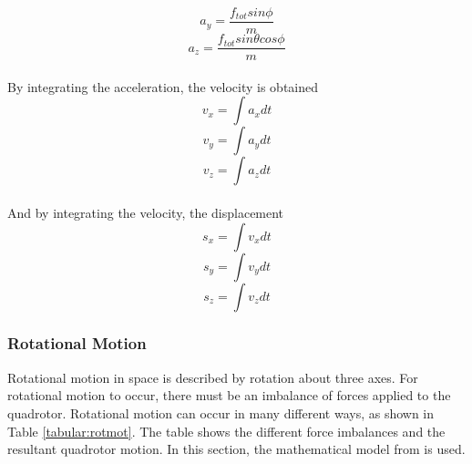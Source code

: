 \begin{equation}
a_y = \frac{f_{tot}sin\phi}{m}
\end{equation}
\begin{equation}
a_z = \frac{f_{tot}sin\theta cos\phi}{m}
\end{equation}
\\
By integrating the acceleration, the velocity is obtained
\begin{equation}
v_x = \int a_xdt
\end{equation}
\begin{equation}
v_y = \int a_ydt
\end{equation}
\begin{equation}
v_z = \int a_zdt
\end{equation}
\\
And by integrating the velocity, the displacement
\begin{equation}
s_x = \int v_xdt
\end{equation}
\begin{equation}
s_y = \int v_ydt
\end{equation}
\begin{equation}
s_z = \int v_zdt
\end{equation}
\clearpage

\subsubsection{Rotational Motion}
Rotational motion in space is described by rotation about three axes. For rotational motion to occur, there must be an imbalance of forces applied to the quadrotor. Rotational motion can occur in many different ways, as shown in Table \ref{tabular:rotmot}. The table shows the different force imbalances and the resultant quadrotor motion. In this section, the mathematical model from \cite{charlesdarwinuni} is used. \\\\

